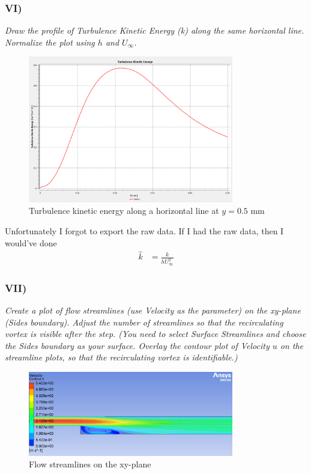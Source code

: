 \subsubsection{VI)}
\textit{Draw the profile of Turbulence Kinetic Energy (k) along the same horizontal line. Normalize the plot using $h$ and $U_\infty$.}
\begin{figure}[H]
    \centering
    \includegraphics[width=0.8\textwidth]{Questions/Figures/tke along line plot.png}
    \caption{Turbulence kinetic energy along a horizontal line at $y = 0.5$ mm}
\end{figure}
Unfortunately I forgot to export the raw data. If I had the raw data, then I would've done
\begin{align*}
    \hat{k} &= \frac{k}{h U_\infty^2}
\end{align*}

\subsubsection{VII)}
\textit{Create a plot of flow streamlines (use Velocity as the parameter) on the xy-plane (Sides boundary). Adjust the number of streamlines so that the recirculating vortex is visible after the step. (You need to select Surface Streamlines and choose the Sides boundary as your surface. Overlay the contour plot of Velocity $u$ on the streamline plots, so that the recirculating vortex is identifiable.)}
\begin{figure}[H]
    \centering
    \includegraphics[width=0.8\textwidth]{Questions/Figures/streamlines plots.png}
    \caption{Flow streamlines on the xy-plane}
\end{figure}

